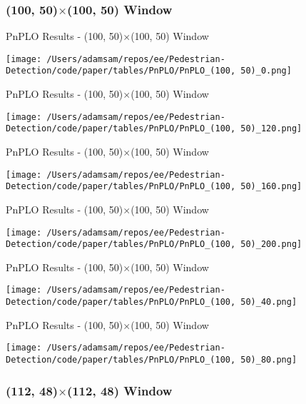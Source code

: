 
\subsubsection*{(100, 50)$\times$(100, 50) Window}

\begin{table}
    \caption{PnPLO Results - (100, 50)$\times$(100, 50) Window}
    \texttt{[image: /Users/adamsam/repos/ee/Pedestrian-Detection/code/paper/tables/PnPLO/PnPLO\_(100, 50)\_0.png]}
    \label{tab:PnPLO_(100, 50)_0}
\end{table}

\begin{table}
    \caption{PnPLO Results - (100, 50)$\times$(100, 50) Window}
    \texttt{[image: /Users/adamsam/repos/ee/Pedestrian-Detection/code/paper/tables/PnPLO/PnPLO\_(100, 50)\_120.png]}
    \label{tab:PnPLO_(100, 50)_120}
\end{table}

\begin{table}
    \caption{PnPLO Results - (100, 50)$\times$(100, 50) Window}
    \texttt{[image: /Users/adamsam/repos/ee/Pedestrian-Detection/code/paper/tables/PnPLO/PnPLO\_(100, 50)\_160.png]}
    \label{tab:PnPLO_(100, 50)_160}
\end{table}

\begin{table}
    \caption{PnPLO Results - (100, 50)$\times$(100, 50) Window}
    \texttt{[image: /Users/adamsam/repos/ee/Pedestrian-Detection/code/paper/tables/PnPLO/PnPLO\_(100, 50)\_200.png]}
    \label{tab:PnPLO_(100, 50)_200}
\end{table}

\begin{table}
    \caption{PnPLO Results - (100, 50)$\times$(100, 50) Window}
    \texttt{[image: /Users/adamsam/repos/ee/Pedestrian-Detection/code/paper/tables/PnPLO/PnPLO\_(100, 50)\_40.png]}
    \label{tab:PnPLO_(100, 50)_40}
\end{table}

\begin{table}
    \caption{PnPLO Results - (100, 50)$\times$(100, 50) Window}
    \texttt{[image: /Users/adamsam/repos/ee/Pedestrian-Detection/code/paper/tables/PnPLO/PnPLO\_(100, 50)\_80.png]}
    \label{tab:PnPLO_(100, 50)_80}
\end{table}

\subsubsection*{(112, 48)$\times$(112, 48) Window}

